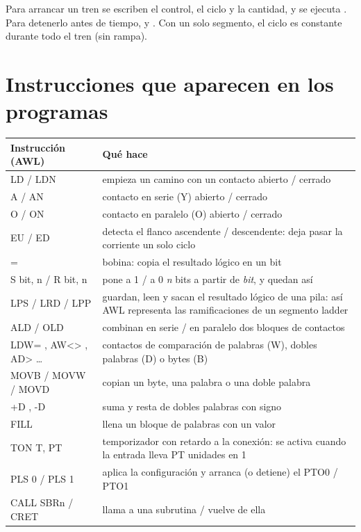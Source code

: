 Para arrancar un tren se escriben el control, el ciclo y la cantidad, y se ejecuta . Para detenerlo antes de tiempo,  y . Con un solo segmento, el ciclo es constante durante todo el tren (sin rampa).

\section{Instrucciones que aparecen en los programas}
\begin{center}\small
\begin{longtable}{>{\ttfamily}p{3.3cm} >{\raggedright\arraybackslash}p{11.8cm}}
\toprule
\textbf{\rmfamily Instrucción (AWL)} & \textbf{Qué hace}\\
\midrule
\endhead
LD / LDN & empieza un camino con un contacto abierto / cerrado\\
A / AN & contacto en serie (Y) abierto / cerrado\\
O / ON & contacto en paralelo (O) abierto / cerrado\\
EU / ED & detecta el flanco ascendente / descendente: deja pasar la corriente un solo ciclo\\
= & bobina: copia el resultado lógico en un bit\\
S bit, n / R bit, n & pone a 1 / a 0 \emph{n} bits a partir de \emph{bit}, y quedan así\\
LPS / LRD / LPP & guardan, leen y sacan el resultado lógico de una pila: así AWL representa las ramificaciones de un segmento ladder\\
ALD / OLD & combinan en serie / en paralelo dos bloques de contactos\\
LDW= , AW<> , AD> \dots & contactos de comparación de palabras (W), dobles palabras (D) o bytes (B)\\
MOVB / MOVW / MOVD & copian un byte, una palabra o una doble palabra\\
+D , -D & suma y resta de dobles palabras con signo\\
FILL & llena un bloque de palabras con un valor\\
TON T, PT & temporizador con retardo a la conexión: se activa cuando la entrada lleva PT unidades en 1\\
PLS 0 / PLS 1 & aplica la configuración y arranca (o detiene) el PTO0 / PTO1\\
CALL SBRn / CRET & llama a una subrutina / vuelve de ella\\
\bottomrule
\end{longtable}
\end{center}


